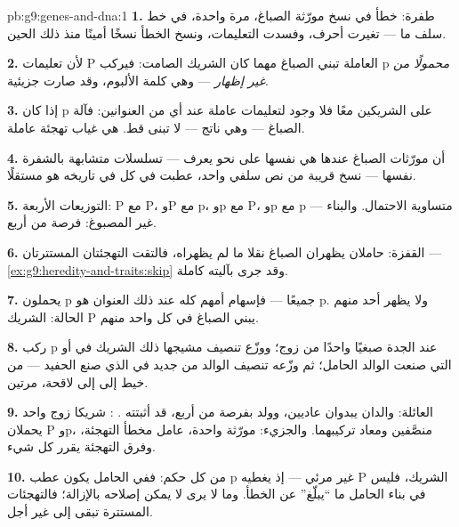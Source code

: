 \begin{solution}{pb:g9:genes-and-dna:1}
\textbf{1.} طفرة: خطأ في نسخ مورّثة الصباغ، مرة واحدة،
في خط  سلف ما --- تغيرت أحرف، وفسدت التعليمات،
ونسخ الخطأ نسخًا أمينًا منذ ذلك الحين.

\textbf{2.} لأن تعليمات P العاملة تبني الصباغ مهما كان
الشريك الصامت: فيركب p \emph{محمولًا من غير إظهار} ---
وهي كلمة الألبوم، وقد صارت جزيئية.

\textbf{3.} إذا كان p على الشريكين معًا فلا وجود
لتعليمات عاملة عند أي من العنوانين: فآلة الصباغ --- وهي
ناتج  --- لا تبنى قط.  هي غياب تهجئة
عاملة.

\textbf{4.} أن مورّثات الصباغ عندها هي  نفسها
على نحو يعرف --- تسلسلات متشابهة بالشفرة نفسها --- نسخ
قريبة من نص سلفي واحد، عطبت في كل  في تاريخه هو
مستقلًا.

\textbf{5.} التوزيعات الأربعة: P مع P، وP مع p، وp مع
P، وp مع p --- متساوية الاحتمال. والبناء غير المصبوغ:
فرصة من أربع.

\textbf{6.} القفزة: حاملان يظهران الصباغ نقلا ما لم
يظهراه، فالتقت التهجئتان المستترتان ---
\cref{ex:g9:heredity-and-traits:skip} وقد جرى بآليته
كاملة.

\textbf{7.} يحملون p جميعًا --- فإسهام أمهم كله عند ذلك
العنوان هو p. ولا يظهر أحد منهم الحالة:  الشريك P
يبني الصباغ في كل واحد منهم.

\textbf{8.} ركب p عند الجدة صبغيًا واحدًا من زوج؛ ووزّع
تنصيف مشيجها ذلك الشريك في  أو  التي صنعت
الوالد الحامل؛ ثم وزّعه تنصيف الوالد من جديد في 
الذي صنع الحفيد --- من خيط إلى  إلى لاقحة، مرتين.

\textbf{9.} العائلة: والدان يبدوان عاديين، وولد بفرصة
من أربع،  قد أثبتته . : شريكا زوج
واحد يحملان P وp، منصَّفين ومعاد تركيبهما. والجزيء:
مورّثة واحدة،  عامل  مخطأ التهجئة، وفرق
التهجئة يقرر كل شيء.

\textbf{10.} من كل حكم: ففي الحامل يكون عطب p غير مرئي
--- إذ يغطيه P الشريك، فليس في بناء الحامل ما ``يبلّغ''
عن الخطأ. وما لا يرى لا يمكن إصلاحه بالإزالة؛ فالتهجئات
المستترة تبقى إلى غير أجل.


\end{solution}
